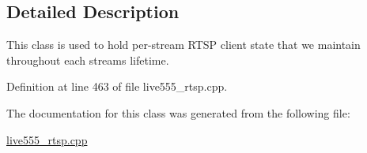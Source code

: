 \subsection{Detailed Description}
This class is used to hold per-\/stream R\+T\+SP client state that we maintain throughout each stream\textquotesingle{}s lifetime. 

Definition at line 463 of file live555\+\_\+rtsp.\+cpp.



The documentation for this class was generated from the following file\+:\begin{DoxyCompactItemize}
\item 
\hyperlink{live555__rtsp_8cpp}{live555\+\_\+rtsp.\+cpp}\end{DoxyCompactItemize}
